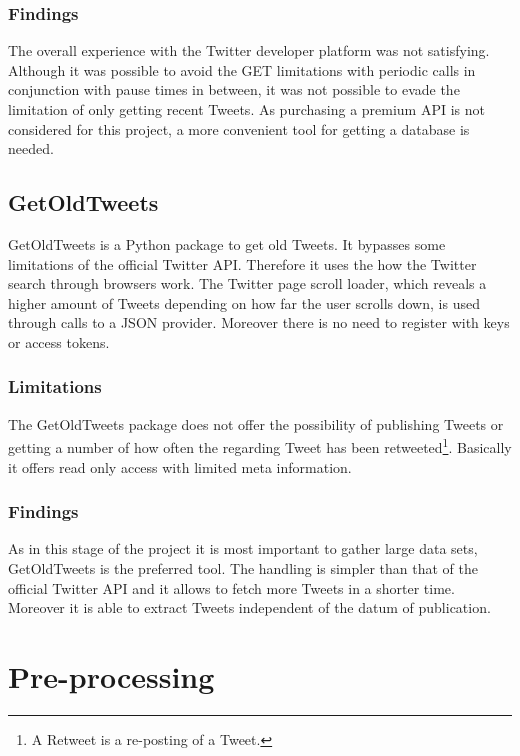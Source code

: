 \documentclass[hidelinks, conference]{IEEEtran}
\begin{document}
\subsubsection{Findings}

The overall experience with the Twitter developer platform was not satisfying. Although it was possible to avoid the GET limitations with periodic calls in conjunction with pause times in between, it was not possible to evade the limitation of only getting recent Tweets. As purchasing a premium API is not considered for this project, a more convenient tool for getting a database is needed.

\subsection{GetOldTweets}\label{subsec_got}

GetOldTweets \cite{got} is a Python package to get old Tweets. It bypasses some limitations of the official Twitter API. Therefore it uses the how the Twitter search through browsers work. The Twitter page scroll loader, which reveals a higher amount of Tweets depending on how far the user scrolls down, is used through calls to a JSON provider. Moreover there is no need to register with keys or access tokens.

\subsubsection{Limitations}

The GetOldTweets package does not offer the possibility of publishing Tweets or getting a number of how often the regarding Tweet has been retweeted\footnote{A Retweet is a re-posting of a Tweet.}. Basically it offers read only access with limited meta information.

\subsubsection{Findings}

As in this stage of the project it is most important to gather large data sets, GetOldTweets is the preferred tool. The handling is simpler than that of the official Twitter API and it allows to fetch more Tweets in a shorter time. Moreover it is able to extract Tweets independent of the datum of publication. 

\section{Pre-processing}
\end{document}
